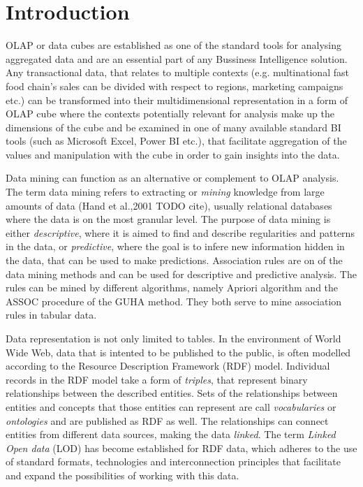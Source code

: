 \chapter*{Introduction}

OLAP \cite{berson1997} or data cubes are established as one of the standard tools for analysing aggregated data and are an essential part of any Bussiness Intelligence solution. Any transactional data, that relates to multiple contexts (e.g. multinational fast food chain's sales can be divided with respect to regions, marketing campaigns etc.) can be transformed into their multidimensional representation in a form of OLAP cube where the contexts potentially relevant for analysis make up the dimensions of the cube and be examined in one of many available standard BI tools (such as Microsoft Excel, Power BI etc.), that facilitate aggregation of the values and manipulation with the cube in order to gain insights into the data.

Data mining can function as an alternative or complement \cite{Chudan2015} to OLAP analysis. The term data mining refers to extracting or \textit{mining} knowledge from large amounts of data (Hand et al.,2001 TODO cite), usually relational databases where the data is on the most granular level. The purpose of data mining is either \textit{descriptive}, where it is aimed to find and describe regularities and patterns in the data, or \textit{predictive}, where the goal is to infere new information hidden in the data, that can be used to make predictions. Association rules are on of the data mining methods and can be used for descriptive and predictive analysis. The rules can be mined by different algorithms, namely Apriori algorithm \cite{Agrawal1993} and the ASSOC procedure of the GUHA method.\cite{hajek1966} They both serve to mine association rules in tabular data.

Data representation is not only limited to tables. In the environment of World Wide Web, data that is intented to be published to the public, is often modelled according to the Resource Description Framework (RDF) model. Individual records in the RDF model take a form of \textit{triples}, that represent binary relationships between the described entities. Sets of the relationships between entities and concepts that those entities can represent are call \textit{vocabularies} or \textit{ontologies} and are published as RDF as well. The relationships can connect entities from different data sources, making the data \textit{linked}. The term \textit{Linked Open data} (LOD) has become established for RDF data, which adheres to the use of standard formats, technologies and interconnection principles that facilitate and expand the possibilities of working with this data. 

